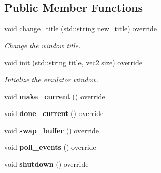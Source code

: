 \subsection*{Public Member Functions}
\begin{DoxyCompactItemize}
\item 
\mbox{\label{classeka2l1_1_1driver_1_1emu__window__glfw3_aff78ce202551f2d655143046a7416249}} 
void \mbox{\hyperlink{classeka2l1_1_1driver_1_1emu__window__glfw3_aff78ce202551f2d655143046a7416249}{change\+\_\+title}} (std\+::string new\+\_\+title) override
\begin{DoxyCompactList}\small\item\em Change the window title. \end{DoxyCompactList}\item 
void \mbox{\hyperlink{classeka2l1_1_1driver_1_1emu__window__glfw3_af2bfbaf8879c5ccb627c08aea9135073}{init}} (std\+::string title, \mbox{\hyperlink{structeka2l1_1_1vec2}{vec2}} size) override
\begin{DoxyCompactList}\small\item\em Intialize the emulator window. \end{DoxyCompactList}\item 
\mbox{\label{classeka2l1_1_1driver_1_1emu__window__glfw3_a13a139b97a15a83c94e264a5e3c77451}} 
void {\bfseries make\+\_\+current} () override
\item 
\mbox{\label{classeka2l1_1_1driver_1_1emu__window__glfw3_ad4b7406c2ca61f6e84fdab713c355710}} 
void {\bfseries done\+\_\+current} () override
\item 
\mbox{\label{classeka2l1_1_1driver_1_1emu__window__glfw3_aa187cea925a43564b194185c7ed5c490}} 
void {\bfseries swap\+\_\+buffer} () override
\item 
\mbox{\label{classeka2l1_1_1driver_1_1emu__window__glfw3_a6cf5230f564bf8fc1147059bef8e6195}} 
void {\bfseries poll\+\_\+events} () override
\item 
\mbox{\label{classeka2l1_1_1driver_1_1emu__window__glfw3_ad749bd841ea3bf763a4f678a87be954c}} 
void {\bfseries shutdown} () override
\end{DoxyCompactItemize}
